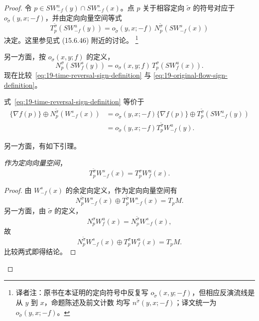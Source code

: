 \begin{proof}
令 $p\in S W_{-f}^u(y)\cap S W_{-f}^s(x)$。点 $p$ 关于相容定向
$\widetilde\sigma$ 的符号对应于 $o_{\widetilde\sigma}(y,x;-f)$，并由定向向量空间等式
\begin{equation}
 T_p^{\widetilde\sigma}(S W_{-f}^u(y))
 =o_{\widetilde\sigma}(y,x;-f)\,
 N_p^{\widetilde\sigma}(S W_{-f}^s(x))
\label{eq:19-time-reversal-sign-definition}
\end{equation}
决定。这里参见式 (15.6.46) 附近的讨论。
\footnote{译者注：原书在本证明的定向符号中反复写
$o_{\widetilde\sigma}(x,y;-f)$，但相应反演流线是从 $y$ 到 $x$，命题陈述及前文计数
均写 $n^{\widetilde\sigma}(y,x;-f)$；译文统一为 $o_{\widetilde\sigma}(y,x;-f)$。}

另一方面，按 $o_\sigma(x,y;f)$ 的定义，
\begin{equation}
 N_p^\sigma(S W_f^s(y))
 =o_\sigma(x,y;f)\,T_p^\sigma(S W_f^u(x)).
\label{eq:19-original-flow-sign-definition}
\end{equation}
现在比较~\eqref{eq:19-time-reversal-sign-definition} 与
\eqref{eq:19-original-flow-sign-definition}。

式~\eqref{eq:19-time-reversal-sign-definition} 等价于
\begin{equation}
\begin{aligned}
 \{\nabla f(p)\}\oplus N_p^{\widetilde\sigma}(W_{-f}^s(x))
 &=o_{\widetilde\sigma}(y,x;-f)
 \{\nabla f(p)\}\oplus T_p^{\widetilde\sigma}(S W_{-f}^u(y))\\
 &=o_{\widetilde\sigma}(y,x;-f)
 T_p^{\widetilde\sigma}W_{-f}^u(y).
\end{aligned}
\label{eq:19-time-reversal-expanded-orientation}
\end{equation}

另一方面，有如下引理。

\begin{lemma}
\label{lem:stable-minus-f-unstable-f-orientation}
\emph{作为定向向量空间}，
\begin{equation}
 T_p^{\widetilde\sigma}W_{-f}^s(x)=T_p^\sigma W_f^u(x).
\label{eq:19-stable-minus-f-unstable-f}
\end{equation}
\end{lemma}

\begin{proof}
由 $W_{-f}^s(x)$ 的余定向定义，作为定向向量空间有
\[
 N_p^{\widetilde\sigma}W_{-f}^s(x)
 \oplus T_p^{\widetilde\sigma}W_{-f}^s(x)=T_pM.
\]
另一方面，由 $\widetilde\sigma$ 的定义，
\[
 N_p^\sigma W_f^u(x)=N_p^{\widetilde\sigma}W_{-f}^s(x),
\]
故
\[
 N_p^{\widetilde\sigma}W_{-f}^s(x)\oplus T_p^\sigma W_f^u(x)=T_pM.
\]
比较两式即得结论。
\end{proof}


\end{proof}
